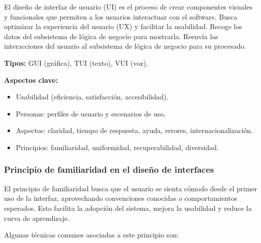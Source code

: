 \begin{definicion}
    El diseño de interfaz de usuario (UI) es el proceso de crear componentes visuales y funcionales que permiten a los usuarios interactuar con el software.
    Busca optimizar la experiencia del usuario (UX) y facilitar la usabilidad.
    Recoge los datos del subsistema de lógica de negocio
    para mostrarla.
    Reenvía las interacciones del usuario al subsistema de lógica de negocio para su procesado.
\end{definicion}

\textbf{Tipos:} GUI (gráfica), TUI (texto), VUI (voz).

\textbf{Aspectos clave:}
\begin{itemize}
    \item Usabilidad (eficiencia, satisfacción, accesibilidad).
    \item Personas: perfiles de usuario y escenarios de uso.
    \item Aspectos: claridad, tiempo de respuesta, ayuda, errores, internacionalización.
    \item Principios: familiaridad, uniformidad, recuperabilidad, diversidad.
\end{itemize}

\subsubsection{Principio de familiaridad en el diseño de interfaces}


El principio de familiaridad busca que el usuario se sienta cómodo desde el primer uso de la interfaz, aprovechando convenciones conocidas o comportamientos esperados.
Esto facilita la adopción del sistema, mejora la usabilidad y reduce la curva de aprendizaje.


Algunas técnicas comunes asociadas a este principio son:


